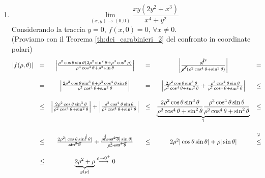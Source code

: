 \begin{example}
\begin{enumerate}
		\item
		\begin{equation*}
			\lim_{(x,y)\rightarrow(0,0)}\frac{xy(2y^2+x^3)}{x^4+y^2}
		\end{equation*}
		Considerando la traccia $y=0$, $f(x,0)=0,\, \forall x\neq 0$.\\
		(Proviamo con il Teorema \ref{th:dei_carabinieri_2} del confronto in coordinate polari)
		\begin{equation*}
			\begin{matrix}
				\left|f(\rho, \theta)\right| &=& \left|\frac{\rho^2\cos\theta\sin\theta(2\rho^2\sin^2\theta+\rho^3\cos^3\rho)}{\rho^4\cos^4\theta+\rho^2\sin\theta}\right| &=&\left|\frac{\rho^{\cancel{4}^2}}{\cancel{\rho^2}(\rho^2\cos^4\theta+\sin^2\theta)}\right| &=& \\\\
				&=&\left|\frac{2\rho^2\cos\theta\sin^3\theta+\rho^3\cos^4\theta\sin\theta}{\rho^2\cos^4\theta+\sin^2\theta}\right|				&=&\left|\frac{2\rho^2\cos\theta\sin^3\theta}{\rho^2\cos^4\theta+\sin^2\theta}+\frac{\rho^3\cos^4\theta\sin\theta}{\rho^2\cos^4\theta+\sin^2\theta}\right| &\leq&\\\\
				&\leq& \left|\frac{2\rho^2\cos\theta\sin^3\theta}{\rho^2\cos^4\theta+\sin^2\theta}\right|+\left|\frac{\rho^3\cos^4\theta\sin\theta}{\rho^2\cos^4\theta+\sin^2\theta}\right| &\leq& \underbrace{\frac{2\rho^2\cos\theta\sin^3\theta}{\rho^2\cos^4\theta+\sin^2\theta}\frac{\rho^3\cos^4\theta\sin\theta}{\rho^2\cos^4\theta+\sin^2\theta}}_{\footnotemark} &\leq&\\\\
				&\leq & \frac{2\rho^2|\cos\theta\sin^{\cancel{3}}\theta|}{\cancel{\sin^2\theta}} + \frac{\rho^{\cancel{3}}\cancel{\cos^4\theta}|\sin\theta|}{\cancel{\rho^2\cos^4\theta}} &\leq& 2\rho^2|\cos\theta\sin\theta|+\rho|\sin\theta| &\overset{\footnotemark}{\leq}&\\\\
				&\leq & \underbrace{2\rho^2+\rho}_{g(\rho)}\overset{\rho\rightarrow0^+}{\longrightarrow}0
			\end{matrix}
		\end{equation*}
		\addtocounter{footnote}{-1}
		

\end{enumerate}
\end{example}
